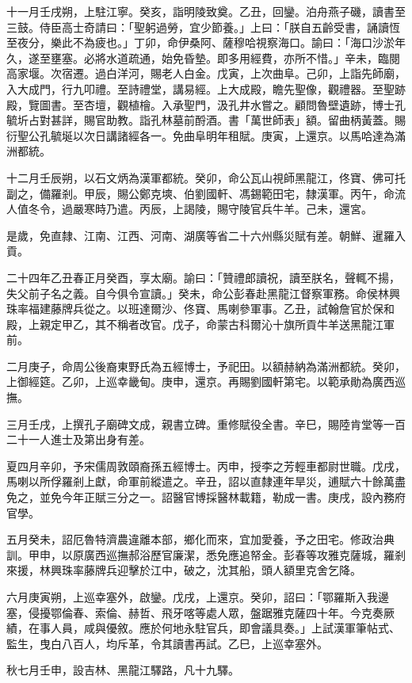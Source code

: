 \begin{pinyinscope}
十一月壬戌朔，上駐江寧。癸亥，詣明陵致奠。乙丑，回鑾。泊舟燕子磯，讀書至三鼓。侍臣高士奇請曰：「聖躬過勞，宜少節養。」上曰：「朕自五齡受書，誦讀恆至夜分，樂此不為疲也。」丁卯，命伊桑阿、薩穆哈視察海口。諭曰：「海口沙淤年久，遂至壅塞。必將水道疏通，始免昏墊。即多用經費，亦所不惜。」辛未，臨閱高家堰。次宿遷。過白洋河，賜老人白金。戊寅，上次曲阜。己卯，上詣先師廟，入大成門，行九叩禮。至詩禮堂，講易經。上大成殿，瞻先聖像，觀禮器。至聖跡殿，覽圖書。至杏壇，觀植檜。入承聖門，汲孔井水嘗之。顧問魯壁遺跡，博士孔毓圻占對甚詳，賜官助教。詣孔林墓前酹酒。書「萬世師表」額。留曲柄黃蓋。賜衍聖公孔毓埏以次日講諸經各一。免曲阜明年租賦。庚寅，上還京。以馬哈達為滿洲都統。

十二月壬辰朔，以石文炳為漢軍都統。癸卯，命公瓦山視師黑龍江，佟寶、佛可托副之，備羅剎。甲辰，賜公鄭克塽、伯劉國軒、馮錫範田宅，隸漢軍。丙午，命流人值冬令，過嚴寒時乃遣。丙辰，上謁陵，賜守陵官兵牛羊。己未，還宮。

是歲，免直隸、江南、江西、河南、湖廣等省二十六州縣災賦有差。朝鮮、暹羅入貢。

二十四年乙丑春正月癸酉，享太廟。諭曰：「贊禮郎讀祝，讀至朕名，聲輒不揚，失父前子名之義。自今俱令宣讀。」癸未，命公彭春赴黑龍江督察軍務。命侯林興珠率福建藤牌兵從之。以班達爾沙、佟寶、馬喇參軍事。乙丑，試翰詹官於保和殿，上親定甲乙，其不稱者改官。戊子，命蒙古科爾沁十旗所貢牛羊送黑龍江軍前。

二月庚子，命周公後裔東野氏為五經博士，予祀田。以額赫納為滿洲都統。癸卯，上御經筵。乙卯，上巡幸畿甸。庚申，還京。再賜劉國軒第宅。以範承勛為廣西巡撫。

三月壬戌，上撰孔子廟碑文成，親書立碑。重修賦役全書。辛巳，賜陸肯堂等一百二十一人進士及第出身有差。

夏四月辛卯，予宋儒周敦頤裔孫五經博士。丙申，授李之芳輕車都尉世職。戊戌，馬喇以所俘羅剎上獻，命軍前縱遣之。辛丑，詔以直隸連年旱災，逋賦六十餘萬盡免之，並免今年正賦三分之一。詔醫官博採醫林載籍，勒成一書。庚戌，設內務府官學。

五月癸未，詔厄魯特濟農違離本部，鄉化而來，宜加愛養，予之田宅。修政治典訓。甲申，以原廣西巡撫郝浴歷官廉潔，悉免應追帑金。彭春等攻雅克薩城，羅剎來援，林興珠率藤牌兵迎擊於江中，破之，沈其船，頭人額里克舍乞降。

六月庚寅朔，上巡幸塞外，啟鑾。戊戌，上還京。癸卯，詔曰：「鄂羅斯入我邊塞，侵擾鄂倫春、索倫、赫哲、飛牙喀等處人眾，盤踞雅克薩四十年。今克奏厥績，在事人員，咸與優敘。應於何地永駐官兵，即會議具奏。」上試漢軍筆帖式、監生，曳白八百人，均斥革，令其讀書再試。乙巳，上巡幸塞外。

秋七月壬申，設吉林、黑龍江驛路，凡十九驛。


\end{pinyinscope}
